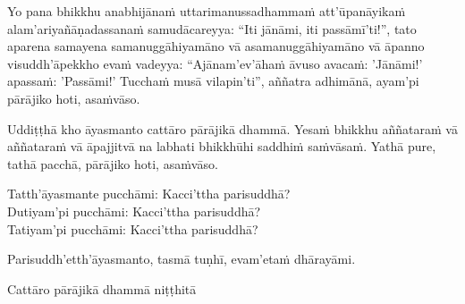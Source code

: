 Yo pana bhikkhu anabhijānaṁ uttarimanussadhammaṁ att'ūpanāyikaṁ alam'ariyañāṇadassanaṁ\makeatletter\hyperlink{endnote33-appendix}\makeatother{} samudācareyya: ``Iti jānāmi, iti passāmī'ti!'', tato aparena samayena samanuggāhiyamāno\makeatletter\hyperlink{endnote34-appendix}\makeatother{} vā asamanuggāhiyamāno\makeatletter\hyperlink{endnote35-appendix}\makeatother{} vā āpanno visuddh'āpekkho evaṁ vadeyya: ``Ajānam'ev'āhaṁ āvuso\makeatletter\hyperlink{endnote36-appendix}\makeatother{} avacaṁ: 'Jānāmi!' apassaṁ: 'Passāmi!' Tucchaṁ musā vilapin'ti'', aññatra adhimānā, ayam'pi pārājiko hoti, asaṁvāso.



\ifafiveversion \clearpage \else \medskip \fi

\begin{center}
	Uddiṭṭhā kho āyasmanto cattāro pārājikā dhammā. Yesaṁ bhikkhu aññataraṁ vā aññataraṁ vā āpajjitvā na labhati bhikkhūhi saddhiṁ saṁvāsaṁ. Yathā pure, tathā pacchā, pārājiko hoti, asaṁvāso.

	\smallskip

	Tatth'āyasmante pucchāmi: Kacci'ttha parisuddhā?\\
	Dutiyam'pi pucchāmi: Kacci'ttha parisuddhā?\\
	Tatiyam'pi pucchāmi: Kacci'ttha parisuddhā?

	\smallskip

	Parisuddh'etth'āyasmanto, tasmā tuṇhī, evam'etaṁ dhārayāmi.
\end{center}

\begin{outro}
	Cattāro pārājikā dhammā niṭṭhitā\makeatletter\hyperlink{endnote10-appendix}\makeatother{}\makeatletter\hyperlink{endnote37-appendix}\makeatother{}
\end{outro}

\clearpage

